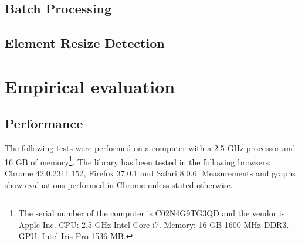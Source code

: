 \documentclass{acm_proc_article-sp}
\newcommand{\code}[1]{\texttt{#1}}
\newcommand{\gls}[1]{#1}
\begin{document}
  \subsection{Batch Processing}
  \subsection{Element Resize Detection}

\section{Empirical evaluation}
  \subsection{Performance}
    The following tests were performed on a computer with a 2.5 GHz processor and 16 GB of memory\footnote{The serial number of the computer is C02N4G9TG3QD and the vendor is Apple Inc. CPU: 2.5 GHz Intel Core i7. Memory: 16 GB 1600 MHz DDR3. GPU: Intel Iris Pro 1536 MB.}.
    The library has been tested in the following browsers: Chrome 42.0.2311.152, Firefox 37.0.1 and Safari 8.0.6.
    Measurements and graphs show evaluations performed in Chrome unless stated otherwise.


\end{document}
